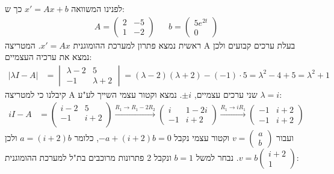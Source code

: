 \documentclass{article}
\begin{document}
לפנינו המשוואה $x'=Ax+b$ כך ש:
\begin{align*}
    A=\begin{pmatrix}
          2 & -5 \\
          1 & -2
      \end{pmatrix} &  & b=\begin{pmatrix}
                               5e^{2t} \\
                               0
                           \end{pmatrix}
\end{align*}
ראשית נמצא פתרון למערכת ההומוגנית $x'=Ax$. המטריצה A בעלת ערכים קבועים ולכן נמצא את ערכיה העצמיים:
\begin{align*}
    |\lambda I - A| & =\begin{vmatrix}
                           \lambda - 2 & 5         \\
                           -1          & \lambda+2
                       \end{vmatrix}=(\lambda-2)(\lambda+2)-(-1)\cdot 5 = \lambda^2-4+5=\lambda^2+1
\end{align*}
קיבלנו כי למטריצה A שני ערכים עצמיים, $\pm i$. נמצא וקטור עצמי השייך לע"ע $\lambda=i$:
\begin{align*}
    iI-A & =\begin{pmatrix}
                i-2 & 5   \\
                -1  & i+2 \\
            \end{pmatrix}\xrightarrow[]{R_1\rightarrow R_1-2R_2}\begin{pmatrix}
                                                                    i  & 1-2i \\
                                                                    -1 & i+2
                                                                \end{pmatrix}\xrightarrow[]{R_1\rightarrow iR_1}\begin{pmatrix}
                                                                                                                    -1 & i+2 \\
                                                                                                                    -1 & i+2
                                                                                                                \end{pmatrix}
\end{align*}
ועבור $v=\begin{pmatrix}
        a \\
        b
    \end{pmatrix}$ וקטור עצמי נקבל $-a+(i+2)b=0$, כלומר $a=(i+2)b$ ולכן $v=b\begin{pmatrix}
        i+2 \\
        1
    \end{pmatrix}$. נבחר למשל $b=1$ ונקבל 2 פתרונות מרוכבים בת"ל למערכת ההומוגנית:
\end{document}
